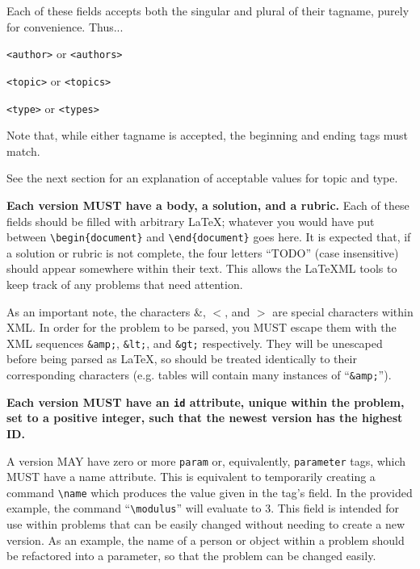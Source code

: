     Each of these fields accepts both the singular and plural of their tagname, purely for convenience. Thus...
    \begin{description}\itemsep0pt
      \item[Authors] \texttt{<author>} or \texttt{<authors>}
      \item[Topic] \texttt{<topic>} or \texttt{<topics>}
      \item[Type] \texttt{<type>} or \texttt{<types>}
    \end{description}
    
    Note that, while either tagname is accepted, the beginning and ending tags must match.
    
    See the next section for an explanation of acceptable values for topic and type.
    
    \textbf{Each version MUST have a body, a solution, and a rubric.} Each of these fields should be filled with arbitrary \LaTeX; whatever you would have put between \texttt{\textbackslash begin\{document\}} and \texttt{\textbackslash end\{document\}} goes here. It is expected that, if a solution or rubric is not complete, the four letters ``TODO'' (case insensitive) should appear somewhere within their text. This allows the \LaTeX ML tools to keep track of any problems that need attention.
    
    As an important note, the characters \&, $<$, and $>$ are special characters within XML. In order for the problem to be parsed, you MUST escape them with the XML sequences \texttt{\&amp;}, \texttt{\&lt;}, and \texttt{\&gt;} respectively. They will be unescaped before being parsed as \LaTeX, so should be treated identically to their corresponding characters (e.g. tables will contain many instances of ``\texttt{\&amp;}'').
    
    \textbf{Each version MUST have an \texttt{id} attribute, unique within the problem, set to a positive integer, such that the newest version has the highest ID.}
    
    A version MAY have zero or more \texttt{param} or, equivalently, \texttt{parameter} tags, which MUST have a name attribute. This is equivalent to temporarily creating a command \texttt{\textbackslash name} which produces the value given in the tag's field. In the provided example, the command ``\texttt{\textbackslash modulus}'' will evaluate to 3. This field is intended for use within problems that can be easily changed without needing to create a new version. As an example, the name of a person or object within a problem should be refactored into a parameter, so that the problem can be changed easily.
    
